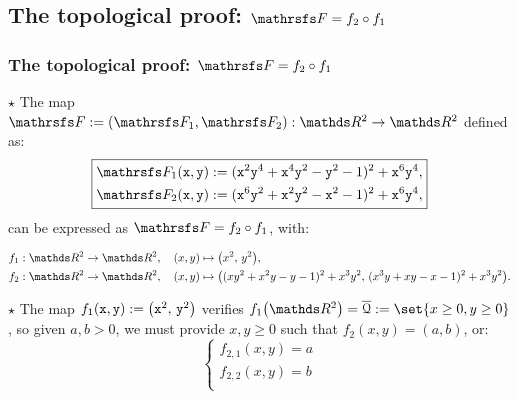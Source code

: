 \documentclass{beamer}
\begin{document}
\subsection{The topological proof: $\FFF=f_2\circ f_1$}
\begin{frame}
\frametitle{The topological proof: $\FFF=f_2\circ f_1$}
$\star$ The map $\FFF:= (\FFF_1, \FFF_2):\R^2\to\R^2$ defined as:
\begin{equation*}\label{eq:thirdMap}
\boxed{
\begin{aligned}
\FFF_1({\tt x}, {\tt y}) := ({\tt x}^2{\tt y}^4+{\tt x}^4{\tt y}^2-{\tt y}^2-1)^2+{\tt x}^6{\tt y}^4,\\
\FFF_2(\x, \y) := ({\tt x}^6{\tt y}^2+{\tt x}^2{\tt y}^2-{\tt x}^2-1)^2+{\tt x}^6{\tt y}^4,
\end{aligned}
}
\end{equation*}
can be expressed as $\FFF = f_2 \circ f_1$, with:

\begin{align*}
&f_1:\R^2\to\R^2,\quad (x,y)\mapsto\big(x^2,\,y^2\big),\\
&f_2:\R^2\to\R^2,\quad (x,y)\mapsto\big((xy^2+x^2y-y-1)^2+x^3y^2,\,(x^3y+xy-x-1)^2+x^3y^2\big).
\end{align*}

$\star$ The map $f_1({\tt x},{\tt y}):=\big({\tt x}^2,\,{\tt y}^2\big)$ verifies $f_1\big(\R^2\big)=\overline{\Qu}:=\set{x\ge 0,y\ge 0}$,
so given $a,b>0$, we must provide $x,y\ge0$ such that $f_2(x,y) = (a,b)$, or:
\begin{equation}\label{eq:systemF}
\left\{
\begin{aligned}
f_{2,1}(x,y)=a\\
f_{2,2}(x,y)=b\\
\end{aligned}
\right.
\end{equation}

\end{frame}
\end{document}
